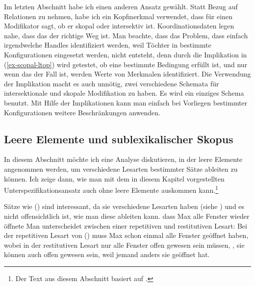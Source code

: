 Im letzten Abschnitt habe ich einen anderen Ansatz gewählt. Statt Bezug auf Relationen zu nehmen,
habe ich ein Kopfmerkmal verwendet, dass für einen Modifikator sagt, ob er skopal oder intersektiv
ist. Koordinationsdaten legen nahe, dass das der richtige Weg ist. Man beachte, dass das Problem,
dass einfach irgendwelche Handles identifiziert werden, weil Töchter in bestimmte Konfigurationen
eingesetzt werden, nicht entsteht, denn durch die Implikation in (\ref{ex-scopal-ltop}) wird getestet, ob eine
bestimmte Bedingung erfüllt ist, und nur wenn das der Fall ist, werden Werte von Merkmalen
identifiziert. Die Verwendung der Implikation macht es auch unnötig, zwei verschiedene Schemata für
intersektionale und skopale Modifikation zu haben. Es wird ein einziges Schema benutzt. Mit Hilfe
der Implikationen kann man einfach bei Vorliegen bestimmter Konfigurationen weitere Beschränkungen anwenden.

\subsection{Leere Elemente und sublexikalischer Skopus}

In diesem Abschnitt möchte ich eine Analyse diskutieren, in der leere Elemente angenommen werden, um
verschiedene Lesarten bestimmter Sätze ableiten zu können. Ich zeige dann, wie man mit dem in diesem
Kapitel vorgestellten Unterspezifikationsansatz auch ohne leere Elemente auskommen
kann.\footnote{Der Text aus diesem Abschnitt basiert auf \citet[Abschnitt~11.9.2]{MuellerGTBuch1}.}

Sätze wie () sind interessant, da sie verschiedene Lesarten haben (siehe
) und es nicht offensichtlich ist, wie man diese ableiten kann.
\ea
\label{ex-alle-wieder}
dass Max alle Fenster wieder öffnete
\z
Man unterscheidet zwischen einer repetitiven und restitutiven Lesart: Bei der repetitiven Lesart von
() muss Max schon einmal alle Fenster geöffnet haben, wobei in der restitutiven Lesart nur
alle Fenster offen gewesen sein müssen, \dash, sie können auch offen gewesen sein, weil jemand anders
sie geöffnet hat. 


